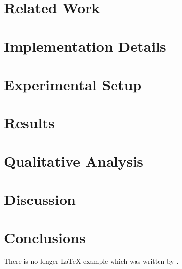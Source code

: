 \documentclass[twocolumn]{article}
\begin{document}
\maketitle






\section{Related Work}\label{sec:related}





\section{Implementation Details}\label{sec:implementation}

\section{Experimental Setup}\label{sec:experiments}

\section{Results}\label{sec:results}

\section{Qualitative Analysis}\label{sec:qualitative}

\section{Discussion}\label{sec:discussion}

\section{Conclusions}\label{conclusions}
There is no longer \LaTeX{} example which was written by \cite{doe}.
\end{document}
